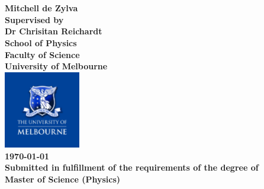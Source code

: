 
\begin{center}
\vspace{2.0cm}
\Huge
\bfseries
{}\\
\\
\mdseries
\vspace{2.0cm}
\Large{Mitchell de Zylva}\\
\vspace{1.0cm} %
\large{
Supervised by\\
Dr Chrisitan Reichardt\\}
\vspace{4.0cm}
\Large{School of Physics}\\
\large{Faculty of Science}\\
\large{University of Melbourne\\}
\vspace{0.5cm}
\includegraphics[width = 0.25\textwidth]{logo.pdf}\\

\vspace{2.0cm}
\Large{\today \\}
\vspace{0.5cm}
\normalsize
Submitted in fulfillment of the requirements of the degree of\\
Master of Science (Physics)
\end{center}